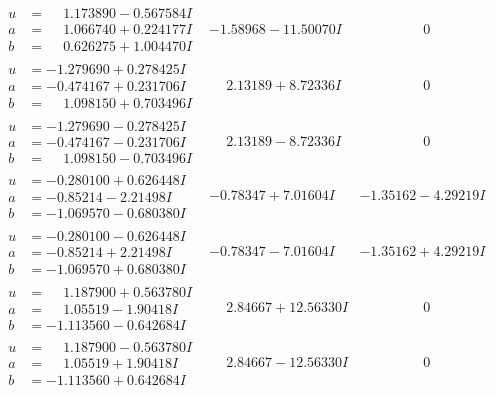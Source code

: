 \documentclass[1p]{elsarticle_modified}
\theoremstyle{definition}
\begin{document}
$$\begin{array}{c|c|c}
\begin{aligned}
u &= \phantom{-}1.173890 - 0.567584 I \\
a &= \phantom{-}1.066740 + 0.224177 I \\
b &= \phantom{-}0.626275 + 1.004470 I\end{aligned}
 & -1.58968 - 11.50070 I & \phantom{-0.000000 } 0 \\ \hline\begin{aligned}
u &= -1.279690 + 0.278425 I \\
a &= -0.474167 + 0.231706 I \\
b &= \phantom{-}1.098150 + 0.703496 I\end{aligned}
 & \phantom{-}2.13189 + 8.72336 I & \phantom{-0.000000 } 0 \\ \hline\begin{aligned}
u &= -1.279690 - 0.278425 I \\
a &= -0.474167 - 0.231706 I \\
b &= \phantom{-}1.098150 - 0.703496 I\end{aligned}
 & \phantom{-}2.13189 - 8.72336 I & \phantom{-0.000000 } 0 \\ \hline\begin{aligned}
u &= -0.280100 + 0.626448 I \\
a &= -0.85214 - 2.21498 I \\
b &= -1.069570 - 0.680380 I\end{aligned}
 & -0.78347 + 7.01604 I & -1.35162 - 4.29219 I \\ \hline\begin{aligned}
u &= -0.280100 - 0.626448 I \\
a &= -0.85214 + 2.21498 I \\
b &= -1.069570 + 0.680380 I\end{aligned}
 & -0.78347 - 7.01604 I & -1.35162 + 4.29219 I \\ \hline\begin{aligned}
u &= \phantom{-}1.187900 + 0.563780 I \\
a &= \phantom{-}1.05519 - 1.90418 I \\
b &= -1.113560 - 0.642684 I\end{aligned}
 & \phantom{-}2.84667 + 12.56330 I & \phantom{-0.000000 } 0 \\ \hline\begin{aligned}
u &= \phantom{-}1.187900 - 0.563780 I \\
a &= \phantom{-}1.05519 + 1.90418 I \\
b &= -1.113560 + 0.642684 I\end{aligned}
 & \phantom{-}2.84667 - 12.56330 I & \phantom{-0.000000 } 0\\

\end{array}$$
\end{document}
